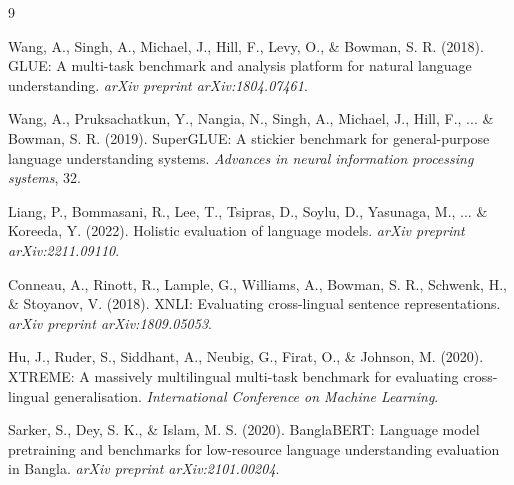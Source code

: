 \documentclass[11pt,a4paper]{article}
\begin{document}

\begin{thebibliography}{9}

Wang, A., Singh, A., Michael, J., Hill, F., Levy, O., \& Bowman, S. R. (2018). GLUE: A multi-task benchmark and analysis platform for natural language understanding. \textit{arXiv preprint arXiv:1804.07461}.

Wang, A., Pruksachatkun, Y., Nangia, N., Singh, A., Michael, J., Hill, F., ... \& Bowman, S. R. (2019). SuperGLUE: A stickier benchmark for general-purpose language understanding systems. \textit{Advances in neural information processing systems}, 32.

Liang, P., Bommasani, R., Lee, T., Tsipras, D., Soylu, D., Yasunaga, M., ... \& Koreeda, Y. (2022). Holistic evaluation of language models. \textit{arXiv preprint arXiv:2211.09110}.

Conneau, A., Rinott, R., Lample, G., Williams, A., Bowman, S. R., Schwenk, H., \& Stoyanov, V. (2018). XNLI: Evaluating cross-lingual sentence representations. \textit{arXiv preprint arXiv:1809.05053}.

Hu, J., Ruder, S., Siddhant, A., Neubig, G., Firat, O., \& Johnson, M. (2020). XTREME: A massively multilingual multi-task benchmark for evaluating cross-lingual generalisation. \textit{International Conference on Machine Learning}.

Sarker, S., Dey, S. K., \& Islam, M. S. (2020). BanglaBERT: Language model pretraining and benchmarks for low-resource language understanding evaluation in Bangla. \textit{arXiv preprint arXiv:2101.00204}.

\end{thebibliography}
\end{document}
